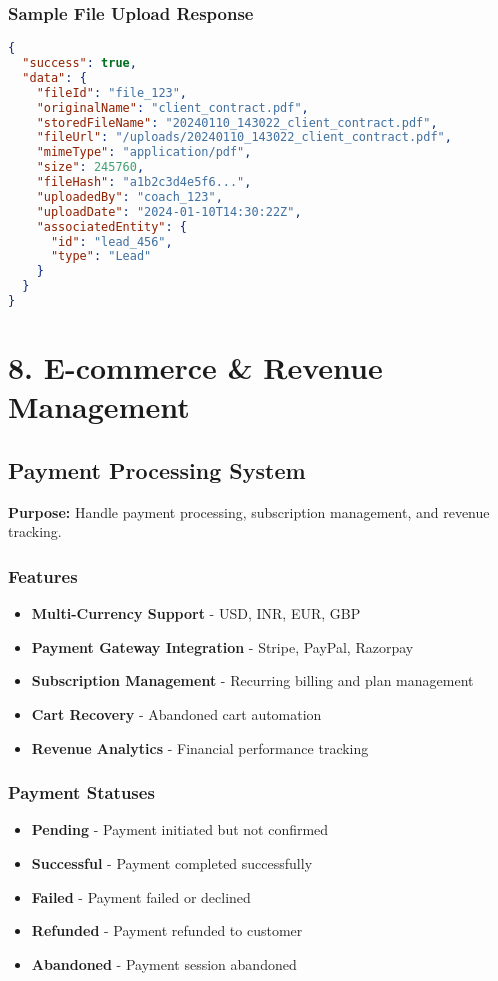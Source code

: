 \documentclass[12pt,a4paper]{article}
\newcommand{\samplecode}[1]{\begin{lstlisting}[language=JSON]#1\end{lstlisting}}
\begin{document}
\subsubsection{Sample File Upload Response}
\samplecode{
{
  "success": true,
  "data": {
    "fileId": "file_123",
    "originalName": "client_contract.pdf",
    "storedFileName": "20240110_143022_client_contract.pdf",
    "fileUrl": "/uploads/20240110_143022_client_contract.pdf",
    "mimeType": "application/pdf",
    "size": 245760,
    "fileHash": "a1b2c3d4e5f6...",
    "uploadedBy": "coach_123",
    "uploadDate": "2024-01-10T14:30:22Z",
    "associatedEntity": {
      "id": "lead_456",
      "type": "Lead"
    }
  }
}
}

\section{8. E-commerce \& Revenue Management}

\subsection{Payment Processing System}
\textbf{Purpose:} Handle payment processing, subscription management, and revenue tracking.

\subsubsection{Features}
\begin{itemize}
    \item \textbf{Multi-Currency Support} - USD, INR, EUR, GBP
    \item \textbf{Payment Gateway Integration} - Stripe, PayPal, Razorpay
    \item \textbf{Subscription Management} - Recurring billing and plan management
    \item \textbf{Cart Recovery} - Abandoned cart automation
    \item \textbf{Revenue Analytics} - Financial performance tracking
\end{itemize}

\subsubsection{Payment Statuses}
\begin{itemize}
    \item \textbf{Pending} - Payment initiated but not confirmed
    \item \textbf{Successful} - Payment completed successfully
    \item \textbf{Failed} - Payment failed or declined
    \item \textbf{Refunded} - Payment refunded to customer
    \item \textbf{Abandoned} - Payment session abandoned
\end{itemize}
\end{document}
